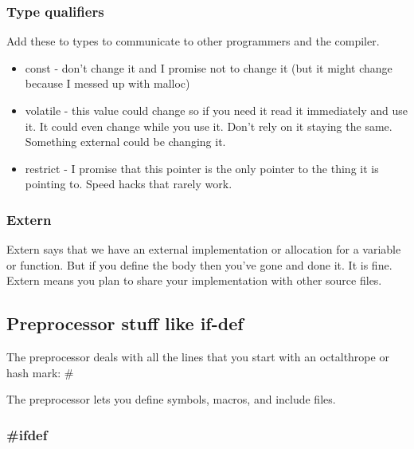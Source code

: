 \documentclass[11pt]{article}
\begin{document}
\subsubsection{Type qualifiers}
\label{sec:org36426c9}

Add these to types to communicate to other programmers and the
compiler.

\begin{itemize}
\item const - don't change it and I promise not to change it (but it might
change because I messed up with malloc)
\item volatile - this value could change so if you need it read it
immediately and use it. It could even change while you use it. Don't
rely on it staying the same. Something external could be changing it.
\item restrict - I promise that this pointer is the only pointer to the
thing it is pointing to. Speed hacks that rarely work.
\end{itemize}

\subsubsection{Extern}
\label{sec:orgefb5f53}

Extern says that we have an external implementation or allocation for
a variable or function. But if you define the body then you've gone
and done it. It is fine. Extern means you plan to share your
implementation with other source files.

\subsection{Preprocessor stuff like if-def}
\label{sec:org0ca5430}
The preprocessor deals with all the lines that you start with an
octalthrope or hash mark: \#

The preprocessor lets you define symbols, macros, and include
files.

\subsubsection{\#ifdef}
\label{sec:orgb69ab94}
\end{document}
